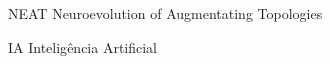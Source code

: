 \begin{siglas}
    \item[NEAT] Neuroevolution of Augmentating Topologies
    \item[IA] Intelig{\^e}ncia Artificial
\end{siglas}
